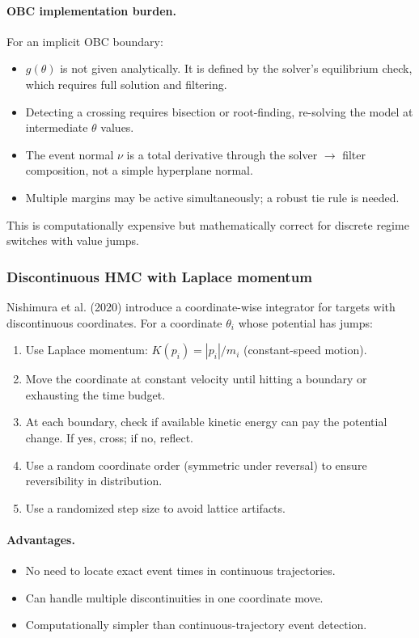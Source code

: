 \paragraph{OBC implementation burden.}
For an implicit OBC boundary:
\begin{itemize}
  \item $g(\theta)$ is not given analytically. It is defined by the solver's
    equilibrium check, which requires full solution and filtering.
  \item Detecting a crossing requires bisection or root-finding, re-solving
    the model at intermediate $\theta$ values.
  \item The event normal $\nu$ is a total derivative through the solver $\to$
    filter composition, not a simple hyperplane normal.
  \item Multiple margins may be active simultaneously; a robust tie rule is
    needed.
\end{itemize}

This is computationally expensive but mathematically correct for discrete
regime switches with value jumps.

\subsubsection{Discontinuous HMC with Laplace momentum}

Nishimura et al. (2020) introduce a coordinate-wise integrator for targets
with discontinuous coordinates. For a coordinate $\theta_i$ whose potential
has jumps:
\begin{enumerate}
  \item Use Laplace momentum: $K(p_i) = |p_i| / m_i$ (constant-speed motion).
  \item Move the coordinate at constant velocity until hitting a boundary or
    exhausting the time budget.
  \item At each boundary, check if available kinetic energy can pay the
    potential change. If yes, cross; if no, reflect.
  \item Use a random coordinate order (symmetric under reversal) to ensure
    reversibility in distribution.
  \item Use a randomized step size to avoid lattice artifacts.
\end{enumerate}

\paragraph{Advantages.}
\begin{itemize}
  \item No need to locate exact event times in continuous trajectories.
  \item Can handle multiple discontinuities in one coordinate move.
  \item Computationally simpler than continuous-trajectory event detection.
\end{itemize}

